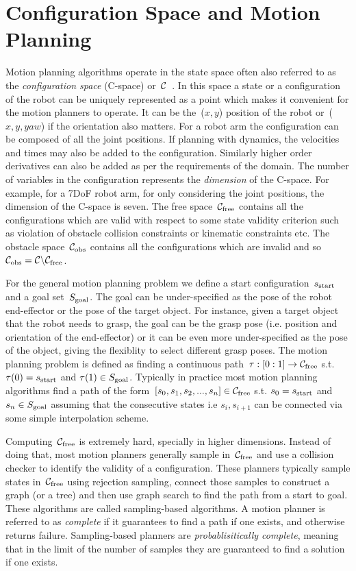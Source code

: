 \documentclass[a4paper]{report}
\begin{document}
\section{Configuration Space and Motion Planning}
Motion planning algorithms operate in the state space often also referred to as the \emph{configuration space} (C-space) or~$\mathcal{C}$~\cite{lozano1990spatial}. In this space a state or a configuration of the robot can be uniquely represented as a point which makes it convenient for the motion planners to operate. It can be the~($x,y$) position of the robot or~($x,y,yaw$) if the orientation also matters. For a robot arm the configuration can be composed of all the joint positions. If planning with dynamics, the velocities and times may also be added to the configuration. Similarly higher order derivatives can also be added as per the requirements of the domain. The number of variables in the configuration represents the \emph{dimension} of the C-space. For example, for a 7DoF robot arm, for only considering the joint positions, the dimension of the C-space is seven. The free space~$\mathcal{C}_{\rm free}$ contains all the configurations which are valid with respect to some state validity criterion such as violation of obstacle collision constraints or kinematic constraints etc. The obstacle space~$\mathcal{C}_{\rm obs}$ contains all the configurations which are invalid and so~$\mathcal{C}_{\rm obs} = \mathcal{C} \backslash \mathcal{C}_{\rm free}$.

For the general motion planning problem we define a start configuration~$s_{\textrm{start}}$ and a goal set~$S_{\rm goal}$. The goal can be under-specified as the pose of the robot end-effector or the pose of the target object. For instance, given a target object that the robot needs to grasp, the goal can be the grasp pose (i.e. position and orientation of the end-effector) or it can be even more under-specified as the pose of the object, giving the flexiblity to select different grasp poses. The motion planning problem is defined as finding a continuous path~$\tau : [0:1] \rightarrow \mathcal{C}_{\rm free}$ s.t. $\tau(0) = s_{\textrm{start}}$ and $\tau(1) \in S_{\rm goal} $. Typically in practice most motion planning algorithms find a path of the form~$[s_0, s_1, s_2,...,s_n] \in \mathcal{C}_{\rm free}$ s.t. $s_0 = s_{\textrm{start}}$ and $s_n \in S_{\rm goal}$ assuming that the consecutive states i.e $s_i, s_{i+1}$ can be connected via some simple interpolation scheme.

Computing~$\mathcal{C}_{\rm free}$ is extremely hard, specially in higher dimensions. Instead of doing that, most motion planners generally sample in~$\mathcal{C}_{\rm free}$ and use a collision checker to identify the validity of a configuration. These planners typically sample states in~$\mathcal{C}_{\rm free}$ using rejection sampling, connect those samples to construct a graph (or a tree) and then use graph search to find the path from a start to goal. These algorithms are called sampling-based algorithms. A motion planner is referred to as \emph{complete} if it guarantees to find a path if one exists, and otherwise returns failure. Sampling-based planners are \emph{probablisitically complete}, meaning that in the limit of the number of samples they are guaranteed to find a solution if one exists.
\end{document}
